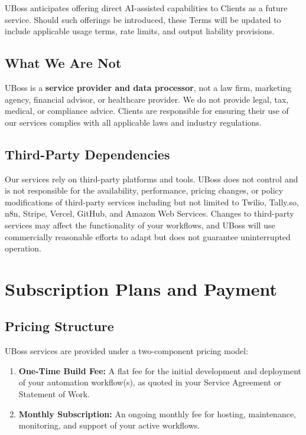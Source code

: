 \documentclass[11pt,letterpaper,parskip=half]{scrartcl}
\begin{document}
UBoss anticipates offering direct AI-assisted capabilities to Clients as a future service. Should such offerings be introduced, these Terms will be updated to include applicable usage terms, rate limits, and output liability provisions.

\subsection{What We Are Not}

UBoss is a \textbf{service provider and data processor}, not a law firm, marketing agency, financial advisor, or healthcare provider. We do not provide legal, tax, medical, or compliance advice. Clients are responsible for ensuring their use of our services complies with all applicable laws and industry regulations.

\subsection{Third-Party Dependencies}

Our services rely on third-party platforms and tools. UBoss does not control and is not responsible for the availability, performance, pricing changes, or policy modifications of third-party services including but not limited to Twilio, Tally.so, n8n, Stripe, Vercel, GitHub, and Amazon Web Services. Changes to third-party services may affect the functionality of your workflows, and UBoss will use commercially reasonable efforts to adapt but does not guarantee uninterrupted operation.

\section{Subscription Plans and Payment}

\subsection{Pricing Structure}

UBoss services are provided under a two-component pricing model:

\begin{enumerate}[nosep, leftmargin=1.5em]
    \item \textbf{One-Time Build Fee:} A flat fee for the initial development and deployment of your automation workflow(s), as quoted in your Service Agreement or Statement of Work.
    \item \textbf{Monthly Subscription:} An ongoing monthly fee for hosting, maintenance, monitoring, and support of your active workflows.
\end{enumerate}
\end{document}
